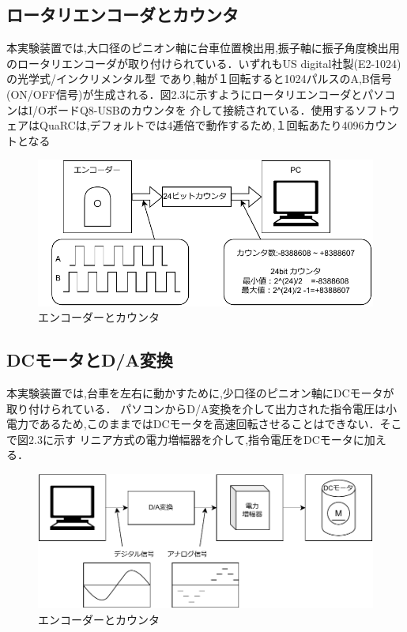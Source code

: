 \subsection{ロータリエンコーダとカウンタ}
本実験装置では,大口径のピニオン軸に台車位置検出用,振子軸に振子角度検出用のロータリエンコーダが取り付けられている．いずれもUS digital社製(E2-1024)の光学式/インクリメンタル型
であり,軸が１回転すると1024パルスのA,B信号(ON/OFF信号)が生成される．図2.3に示すようにロータリエンコーダとパソコンはI/OボードQ8-USBのカウンタを
介して接続されている．使用するソフトウェアはQuaRCは,デフォルトでは4逓倍で動作するため,１回転あたり4096カウントとなる

\begin{figure}[H]
  \centering
  \includegraphics[scale=1]{sozai/encordertokaunnta.pdf}
  \caption{エンコーダーとカウンタ}
\end{figure}

\subsection{DCモータとD/A変換}
本実験装置では,台車を左右に動かすために,少口径のピニオン軸にDCモータが取り付けられている．
パソコンからD/A変換を介して出力された指令電圧は小電力であるため,このままではDCモータを高速回転させることはできない．そこで図2.3に示す
リニア方式の電力増幅器を介して,指令電圧をDCモータに加える．

\begin{figure}[H]
  \centering
  \includegraphics[scale=1]{sozai/DCmotaADhenkan.pdf}
  \caption{エンコーダーとカウンタ}
\end{figure}

